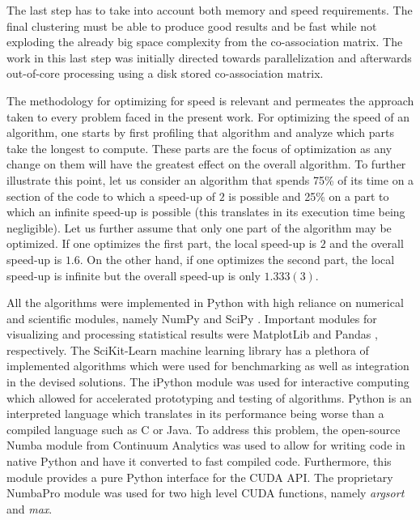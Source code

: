 The last step has to take into account both memory and speed requirements.
The final clustering must be able to produce good results and be fast while not exploding the already big space complexity from the co-association matrix.
The work in this last step was initially directed towards parallelization and afterwards out-of-core processing using a disk stored co-association matrix.%

The methodology for optimizing for speed is relevant and permeates the approach taken to every problem faced in the present work.
For optimizing the speed of an algorithm, one starts by first profiling that algorithm and analyze which parts take the longest to compute.
These parts are the focus of optimization as any change on them will have the greatest effect on the overall algorithm.
To further illustrate this point, let us consider an algorithm that spends 75\% of its time on a section of the code to which a speed-up of $2$ is possible and 25\% on a part to which an infinite speed-up is possible (this translates in its execution time being negligible).
Let us further assume that only one part of the algorithm may be optimized.
If one optimizes the first part, the local speed-up is $2$ and the overall speed-up is $1.6$.
On the other hand, if one optimizes the second part, the local speed-up is infinite but the overall speed-up is only $1.333(3)$.

All the algorithms were implemented in Python with high reliance on numerical and scientific modules, namely NumPy \cite{VanDerWalt2011} and SciPy \cite{JonesSciPy,Oliphant2007,Millman2011}.
Important modules for visualizing and processing statistical results were MatplotLib \cite{hunter2007matplotlib} and Pandas \cite{McKinney2010}, respectively.
The SciKit-Learn \cite{Pedregosa2011} machine learning library has a plethora of implemented algorithms which were used for benchmarking as well as integration in the devised solutions.
The iPython \cite{Perez2007} module was used for interactive computing which allowed for accelerated prototyping and testing of algorithms.
Python is an interpreted language which translates in its performance being worse than a compiled language such as C or Java.
To address this problem, the open-source Numba \cite{numba} module from Continuum Analytics was used to allow for writing code in native Python and have it converted to fast compiled code.
Furthermore, this module provides a pure Python interface for the CUDA API.
The proprietary NumbaPro module was used for two high level CUDA functions, namely \emph{argsort} and \emph{max}. %


